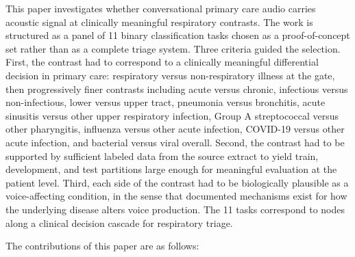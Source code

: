 \documentclass[utf8]{FrontiersinHarvard} %
\begin{document}
This paper investigates whether conversational primary care audio carries acoustic signal at clinically meaningful respiratory contrasts. The work is structured as a panel of 11 binary classification tasks chosen as a proof-of-concept set rather than as a complete triage system. Three criteria guided the selection. First, the contrast had to correspond to a clinically meaningful differential decision in primary care: respiratory versus non-respiratory illness at the gate, then progressively finer contrasts including acute versus chronic, infectious versus non-infectious, lower versus upper tract, pneumonia versus bronchitis, acute sinusitis versus other upper respiratory infection, Group A streptococcal versus other pharyngitis, influenza versus other acute infection, COVID-19 versus other acute infection, and bacterial versus viral overall. Second, the contrast had to be supported by sufficient labeled data from the source extract to yield train, development, and test partitions large enough for meaningful evaluation at the patient level. Third, each side of the contrast had to be biologically plausible as a voice-affecting condition, in the sense that documented mechanisms exist for how the underlying disease alters voice production. The 11 tasks correspond to nodes along a clinical decision cascade for respiratory triage.

The contributions of this paper are as follows:
\end{document}
